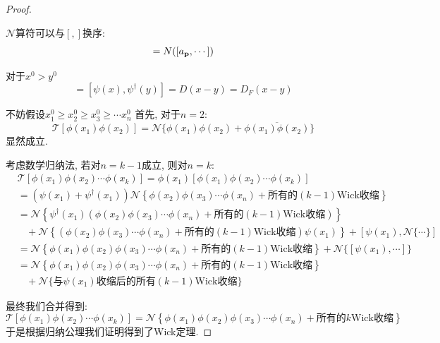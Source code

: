 \begin{proof}
    \begin{lemma}\label{lemma:N_commute}
        $\mathcal N$算符可以与$[,]$换序:
        \begin{equation}
            [\a{p}, N(\cdots)]=N([\a{p}, \cdots])
        \end{equation}
    \end{lemma}
    \begin{lemma}\label{lemma:psi_commute}
        对于$x^0>y^0$
        \begin{equation}
            [\psi(x), \phi(y)]=[\psi(x), \psi^\dagger(y)]=D(x-y)=D_F(x-y)
        \end{equation}
    \end{lemma}
    不妨假设$x_1^0\geq x_2^0 \geq x_3^0\geq\cdots x_n^0$
    首先, 对于$n=2$:
    \begin{equation}
        \mathcal T[\phi(x_1)\phi(x_2)]=\mathcal N\{\phi(x_1)\phi(x_2)+\overline{\phi(x_1)\phi(x_2)}\}
    \end{equation}
    显然成立.

    考虑数学归纳法, 若对$n=k-1$成立, 则对$n=k$:
    \begin{align*}
        &\mathcal T\left[\phi(x_1)\phi(x_2)\cdots\phi(x_k)\right]=\phi(x_1)\left[\phi(x_1)\phi(x_2)\cdots\phi(x_k)\right]\\
        &=(\psi(x_1)+\psi^\dagger(x_1))\mathcal N\left\{\phi(x_2)\phi(x_3)\cdots\phi(x_n)+\text{所有的}(k-1)\text{Wick收缩}\right\}\\
        &=\mathcal N\left\{\psi^\dagger(x_1)(\phi(x_2)\phi(x_3)\cdots\phi(x_n)+\text{所有的}(k-1)\text{Wick收缩})\right\}\\
        &~~~~+\mathcal N\left\{(\phi(x_2)\phi(x_3)\cdots\phi(x_n)+\text{所有的}(k-1)\text{Wick收缩})\psi(x_1)\right\}+[\psi(x_1), \mathcal N\{\cdots\}]\\
        &=\mathcal N\left\{\phi(x_1)\phi(x_2)\phi(x_3)\cdots\phi(x_n)+\text{所有的}(k-1)\text{Wick收缩}\right\}+\mathcal N\{[\psi(x_1), \cdots]\}\\
        &=\mathcal N\left\{\phi(x_1)\phi(x_2)\phi(x_3)\cdots\phi(x_n)+\text{所有的}(k-1)\text{Wick收缩}\right\}\\
        &~~~~+\mathcal N\{\text{与}\psi(x_1)\text{收缩后的所有}(k-1)\text{Wick收缩}\}
    \end{align*}

    最终我们合并得到:
    \begin{equation}
        \mathcal T\left[\phi(x_1)\phi(x_2)\cdots\phi(x_k)\right]=\mathcal N\left\{\phi(x_1)\phi(x_2)\phi(x_3)\cdots\phi(x_n)+\text{所有的}k\text{Wick收缩}\right\}
    \end{equation}
    于是根据归纳公理我们证明得到了Wick定理.

\end{proof}

